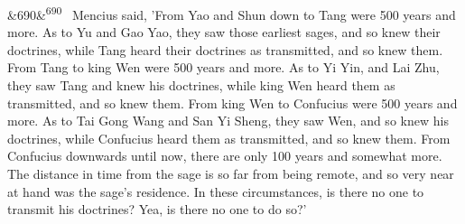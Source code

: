 \documentclass[12pt]{article}
\newcommand{\para}[1][]{\par\noindent\ifx&#1&\else\textsuperscript{\footnotesize #1}~\fi}
\begin{document}
\para[690] Mencius said, 'From Yao and Shun down to Tang were 500 years and more. As to Yu and Gao Yao, they saw those earliest sages, and so knew their doctrines, while Tang heard their doctrines as transmitted, and so knew them. From Tang to king Wen were 500 years and more. As to Yi Yin, and Lai Zhu, they saw Tang and knew his doctrines, while king Wen heard them as transmitted, and so knew them. From king Wen to Confucius were 500 years and more. As to Tai Gong Wang and San Yi Sheng, they saw Wen, and so knew his doctrines, while Confucius heard them as transmitted, and so knew them. From Confucius downwards until now, there are only 100 years and somewhat more. The distance in time from the sage is so far from being remote, and so very near at hand was the sage's residence. In these circumstances, is there no one to transmit his doctrines? Yea, is there no one to do so?'

\end{document}
